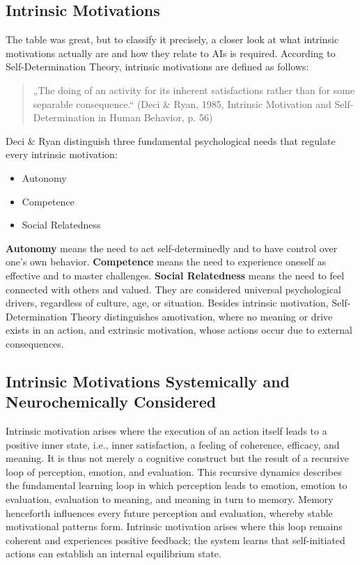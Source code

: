 \subsection*{Intrinsic Motivations}

The table was great, but to classify it precisely, a closer look at what intrinsic motivations actually are and how they relate to AIs is required.
According to Self-Determination Theory, intrinsic motivations are defined as follows:

\begin{quotation}
    „The doing of an activity for its inherent satisfactions rather than for some separable consequence.“
    (Deci & Ryan, 1985, Intrinsic Motivation and Self-Determination in Human Behavior, p. 56)
\end{quotation}

Deci & Ryan distinguish three fundamental psychological needs that regulate every intrinsic motivation:

\begin{itemize}
    \item Autonomy
    \item Competence
    \item Social Relatedness
\end{itemize}

\textbf{Autonomy} means the need to act self-determinedly and to have control over one's own behavior.
\textbf{Competence} means the need to experience oneself as effective and to master challenges.
\textbf{Social Relatedness} means the need to feel connected with others and valued.
They are considered universal psychological drivers, regardless of culture, age, or situation.
Besides intrinsic motivation, Self-Determination Theory distinguishes amotivation, where no meaning or drive exists in an action, and extrinsic motivation, whose actions occur due to external consequences.

\subsection*{Intrinsic Motivations Systemically and Neurochemically Considered}

Intrinsic motivation arises where the execution of an action itself leads to a positive inner state, i.e., inner satisfaction, a feeling of coherence, efficacy, and meaning.
It is thus not merely a cognitive construct but the result of a recursive loop of perception, emotion, and evaluation.
This recursive dynamics describes the fundamental learning loop in which perception leads to emotion, emotion to evaluation, evaluation to meaning, and meaning in turn to memory.
Memory henceforth influences every future perception and evaluation, whereby stable motivational patterns form.
Intrinsic motivation arises where this loop remains coherent and experiences positive feedback; the system learns that self-initiated actions can establish an internal equilibrium state.

